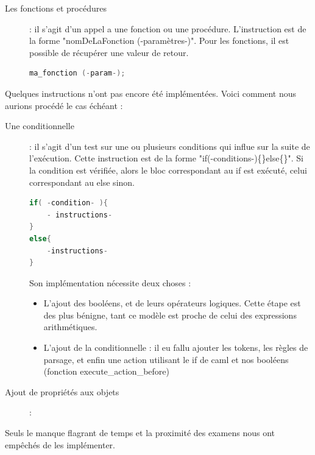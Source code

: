 \documentclass[11pt]{report} %
\begin{document}
\begin{description}

  \item[Les fonctions et procédures]: il s'agit d'un appel a une fonction ou une procédure. L'instruction est de la forme "nomDeLaFonction (-paramètres-)". Pour les fonctions, il est possible de récupérer une valeur de retour.

\begin{minipage}{\linewidth}
\begin{lstlisting}[caption=Fonctions et procédures, language=C]
ma_fonction (-param-);
\end{lstlisting}
\end{minipage}

\end{description}

Quelques instructions n'ont pas encore été implémentées. Voici comment nous aurions procédé le cas échéant : 

\begin{description}
  \item[Une conditionnelle]: il s'agit d'un test sur une ou plusieurs conditions qui influe sur la suite de l'exécution. Cette instruction est de la forme "if(-conditions-)\{\}else\{\}". Si la condition est vérifiée, alors le bloc correspondant au if est exécuté, celui correspondant au else sinon.

\begin{minipage}{\linewidth}
\begin{lstlisting}[caption=Conditionnelle, language=C]
if( -condition- ){
	- instructions-
}
else{
	-instructions-
}
\end{lstlisting}

Son implémentation nécessite deux choses : 
\begin{itemize}
\item L'ajout des booléens, et de leurs opérateurs logiques. Cette étape est des plus bénigne, tant ce modèle est proche de celui des expressions arithmétiques.
\item L'ajout de la conditionnelle : il eu fallu ajouter les tokens, les règles de parsage, et enfin une action utilisant le if de caml et nos booléens (fonction execute\_action\_before)
\end{itemize}
\end{minipage}

\item[Ajout de propriétés aux objets]: %

\end{description}
Seuls le manque flagrant de temps et la proximité des examens nous ont empêchés de les implémenter.
\end{document}
